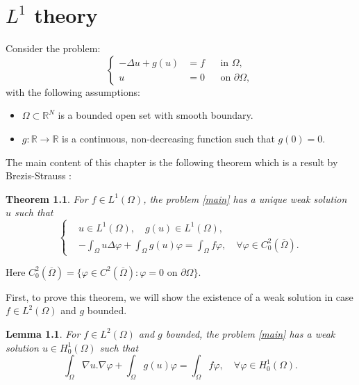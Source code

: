 \documentclass[a4paper, 11pt]{report}
\newtheorem{thm}{Theorem}[chapter]
\newtheorem{lmm}{Lemma}[chapter]
\theoremstyle{definition}\newtheorem*{rmk}{Remark}
\begin{document}
\tableofcontents
\setcounter{page}{3}
\thispagestyle{empty}

\chapter{\texorpdfstring{$L^1$ theory}{L1 theory}}
\mbox{}

Consider the problem:
\begin{equation}\label{main}
\left\{
\begin{aligned}
-\Delta u + g(u) & = f && \text{in } \Omega , \\
u & = 0 && \text{on } \partial \Omega ,
\end{aligned}
\right.
\end{equation}
with the following assumptions:
\begin{itemize}
\item $\Omega \subset \mathbb{R}^N$ is a bounded open set with smooth boundary.
\item $g: \mathbb{R} \to \mathbb{R}$ is a continuous, non-decreasing function such that $g(0) = 0$.
\end{itemize}

The main content of this chapter is the following theorem which is a result by Brezis-Strauss \cite[Theorem 1]{BS}:

\begin{thm}\label{L1thm}
For $f \in L^1(\Omega)$, the problem \eqref{main} has a unique weak solution $u$ such that
\begin{equation}\label{weak}
\left\{
\begin{aligned}
& u \in L^1(\Omega ),\quad g(u) \in L^1(\Omega ) ,\\
&-\int_{\Omega} u \Delta \varphi + \int_{\Omega} g(u)\varphi = \int_{\Omega}f\varphi, \quad \forall \varphi \in C^2_0(\overline{\Omega}) .
\end{aligned}
\right.
\end{equation}
\end{thm}

Here $C^2_0(\overline{\Omega}) = \{\varphi \in C^2(\overline{\Omega}): \varphi = 0 \text{ on } \partial \Omega\}$.

First, to prove this theorem, we will show the existence of a weak solution in case $f \in L^2(\Omega)$ and $g$ bounded.

\begin{lmm}\label{L2glmm}
For $f \in L^2(\Omega)$ and $g$ bounded, the problem \eqref{main} has a weak solution $u \in H^1_0(\Omega )$ such that
\[
\int_{\Omega} \nabla u . \nabla \varphi + \int_{\Omega} g(u)\varphi = \int_{\Omega}f\varphi, \quad \forall \varphi \in H^1_0(\Omega) .
\]
\end{lmm}
\end{document}
